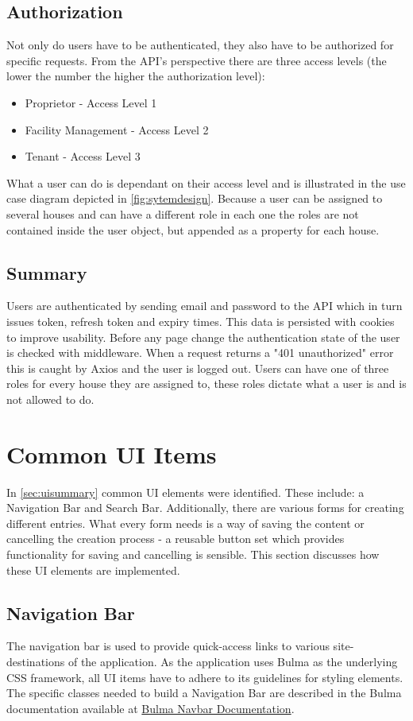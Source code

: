 \subsection{Authorization}
Not only do users have to be authenticated, they also have to be authorized for specific requests. From the API's perspective there are three access levels (the lower the number the higher the authorization level): 

\begin{itemize}
  \item Proprietor - Access Level 1
  \item Facility Management - Access Level 2
  \item Tenant - Access Level 3
\end{itemize}

What a user can do is dependant on their access level and is illustrated in the use case diagram depicted in \autoref{fig:sytemdesign}.
Because a user can be assigned to several houses and can have a different role in each one the roles are not contained inside the user object, but appended as a property for each house.

\subsection{Summary}
Users are authenticated by sending email and password to the API which in turn issues token, refresh token and expiry times. This data is persisted with cookies to improve usability. Before any page change the authentication state of the user is checked with middleware. When a request returns a "401 unauthorized" error this is caught by Axios and the user is logged out. Users can have one of three roles for every house they are assigned to, these roles dictate what a user is and is not allowed to do.

\section{Common UI Items}
In \autoref{sec:uisummary} common UI elements were identified. These include: a Navigation Bar and Search Bar. Additionally, there are various forms for creating different entries. What every form needs is a way of saving the content or cancelling the creation process - a reusable button set which provides functionality for saving and cancelling is sensible. This section discusses how these UI elements are implemented.

\subsection{Navigation Bar}
The navigation bar is used to provide quick-access links to various site-destinations of the application.
As the application uses Bulma as the underlying CSS framework, all UI items have to adhere to its guidelines for styling elements. The specific classes needed to build a Navigation Bar are described in the Bulma documentation available at \href{https://bulma.io/documentation/components/navbar/}{Bulma Navbar Documentation}.

